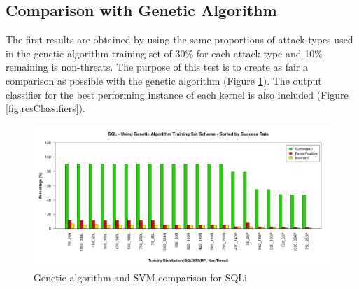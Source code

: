 \newpage
\subsection{Comparison with Genetic Algorithm}

The first results are obtained by using the same proportions of attack types used in the genetic algorithm training set of 30\% for each attack type and 10\% remaining is non-threats. The purpose of this test is to create as fair a comparison as possible with the genetic algorithm (Figure \ref{fig:resComparison}).  The output classifier for the best performing instance of each kernel is also included (Figure \ref{fig:resClassifiers}).

\begin{figure}[hb]
	\centering
	\includegraphics[width=450px]{./assets/results/svm/comparison/Results_SQL.png}
	\caption{Genetic algorithm and SVM comparison for SQLi}
	\label{fig:resComparison}
\end{figure}

